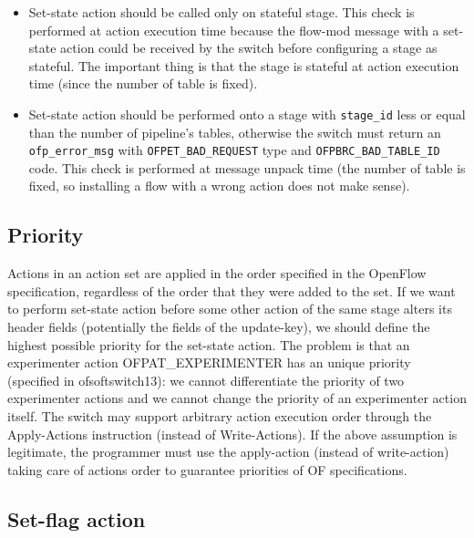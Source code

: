 \begin{itemize}
    \item Set-state action should be called only on stateful stage. This check is performed at action execution time because the flow-mod message with a set-state action could be received by the switch before configuring a stage as stateful. The important thing is that the stage is stateful at action execution time (since the number of table is fixed).

    \item Set-state action should be performed onto a stage with \texttt{stage\_id} less or equal than the number of pipeline’s tables, otherwise the switch must return an \texttt{ofp\_error\_msg} with \texttt{OFPET\_BAD\_REQUEST} type and \texttt{OFPBRC\_BAD\_TABLE\_ID} code. This check is performed at message unpack time (the number of table is fixed, so installing a flow with a wrong action does not make sense).
\end{itemize}

\subsection{Priority}

Actions in an action set are applied in the order specified in the OpenFlow specification, regardless of the order that they were added to the set.
If we want to perform set-state action before some other action of the same stage alters its header fields (potentially the fields of the update-key), we should define the highest possible priority for the set-state action.
The problem is that an experimenter action OFPAT\_EXPERIMENTER has an unique priority (specified in ofsoftswitch13): we cannot differentiate the priority of two experimenter actions and we cannot change the priority of an experimenter action itself.
The switch may support arbitrary action execution order through the Apply-Actions instruction (instead of Write-Actions).
If the above assumption is legitimate, the programmer must use the apply-action (instead of write-action) taking care of actions order to guarantee priorities of OF specifications.

\subsection{Set-flag action}
\label{sec:set_flag_action_proto}

